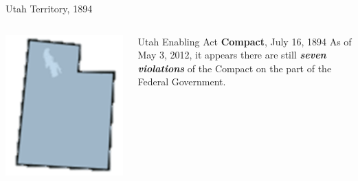\begin{frame}{Utah Territory, 1894}
    \begin{columns}[onlytextwidth]
            \centering
            \includegraphics[height=0.75\textheight]{img/utah-state.png} \\

            \begin{block}{Utah Enabling Act \textbf{Compact}, July 16, 1894}
                As of May 3, 2012, it appears there are still \textbf{\emph{{\color{red}seven violations}}} of the Compact on the part of the Federal Government.
            \end{block}
    \end{columns}
\end{frame}

